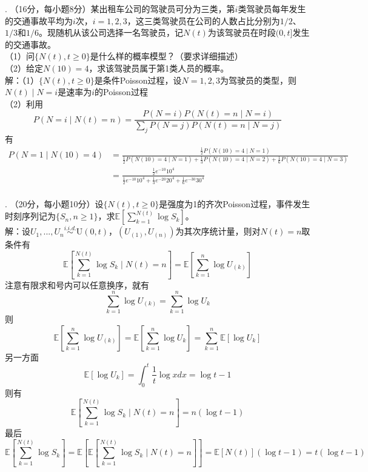 \documentclass[UTF8,openany]{book}
\begin{document}
. （16分，每小题8分）某出租车公司的驾驶员可分为三类，第$i$类驾驶员每年发生的交通事故平均为$i$次，$i=1,2,3$，这三类驾驶员在公司的人数占比分别为$1/2$、$1/3$和$1/6$。现随机从该公司选择一名驾驶员，记$N(t)$为该驾驶员在时段$(0,t]$发生的交通事故。\\
（1）问$\{N(t), t \geq 0\}$是什么样的概率模型？（要求详细描述）\\
（2）给定$N(10)=4$，求该驾驶员属于第1类人员的概率。\\
解：（1）$\{N(t), t \geq 0\}$是条件Poisson过程，设$N=1,2,3$为驾驶员的类型，则$N(t)\mid N=i$是速率为$i$的Poisson过程\\
（2）利用
\[
P(N=i \mid N(t)=n)=\frac{P(N=i)P(N(t)=n\mid N=i)}{\sum\limits_{j}P(N=j)P(N(t)=n\mid N=j)}
\]
有
\begin{align*}
	P(N=1 \mid N(10)=4) &= \frac{\frac{1}{2}P(N(10)=4\mid N=1)}{\frac{1}{2}P(N(10)=4\mid N=1)+\frac{1}{3}P(N(10)=4\mid N=2)+\frac{1}{6}P(N(10)=4\mid N=3)} \\
	& = \frac{\frac{1}{2}e^{-10} 10^4}{\frac{1}{2}e^{-10} 10^4+\frac{1}{3}e^{-20} 20^4+\frac{1}{6}e^{-30} 30^4}
\end{align*}\\







. （20分，每小题10分）设$\{N(t), t \geq 0\}$是强度为1的齐次Poisson过程，事件发生时刻序列记为$\{S_n, n \geq 1\}$，求$\mathbb{E}\left[\sum\limits_{k=1}^{N(t)} \log S_k \right]$。\\
解：设$U_1,...,U_n\stackrel{i.i.d.}{\sim }\mathrm{U}(0,t)$，$(U_{(1)},U_{(n)})$为其次序统计量，则对$N(t)=n$取条件有
\[
\mathbb{E}\left[\sum\limits_{k=1}^{N(t)} \log S_k \mid N(t)=n \right]=\mathbb{E}\left[\sum\limits_{k=1}^{n} \log U_{(k)} \right]
\]
注意有限求和号内可以任意换序，就有
\[
\sum\limits_{k=1}^{n} \log U_{(k)}=\sum\limits_{k=1}^{n} \log U_{k} 
\]
则
\[
\mathbb{E}\left[\sum\limits_{k=1}^{n} \log U_{(k)} \right]=\mathbb{E}\left[\sum\limits_{k=1}^{n} \log U_{k} \right]=\sum\limits_{k=1}^{n}\mathbb{E}\left[\log U_{k} \right]
\]
另一方面
\[
\mathbb{E}\left[\log U_{k} \right]=\int_{0}^{t} \frac{1}{t} \log x dx=\log t -1
\]
则有
\[
\mathbb{E}\left[\sum\limits_{k=1}^{N(t)} \log S_k \mid N(t)=n \right]=n(\log t - 1)
\]
最后
\[
\mathbb{E}\left[\sum\limits_{k=1}^{N(t)} \log S_k  \right]=\mathbb{E}\left[\mathbb{E}\left[\sum\limits_{k=1}^{N(t)} \log S_k \mid N(t)=n \right] \right] =\mathbb{E}[N(t)](\log t - 1)=t(\log t - 1)
\]\\
\newpage
\end{document}
